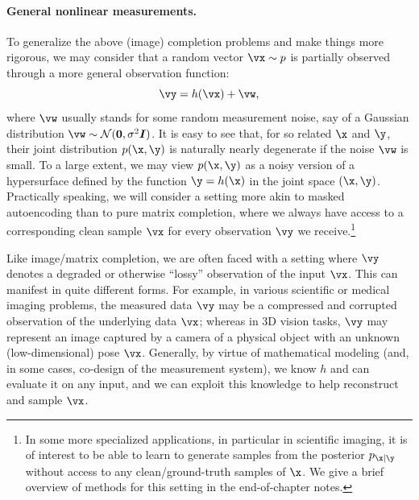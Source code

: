 \documentclass[../../book-main.tex]{subfiles}
\begin{document}
\paragraph{General nonlinear measurements.}
To generalize the above (image) completion problems and make things more rigorous, we may consider that a random vector $\vx \sim p$ is partially observed through a more
general observation function:
\begin{equation}\label{eq:measurement-matching-observation}
\vy = h(\vx) + \vw,
\end{equation}
where $\vw$ usually stands for some random measurement noise, say of
a Gaussian distribution $\vw \sim \mathcal{N}(\mathbf{0}, \sigma^2
\boldsymbol{I})$. It is easy to see that, for so related $\x$ and $\y$, their joint distribution $p(\x, \y)$ is naturally nearly degenerate if the noise $\vw$ is small. To a large extent, we may view $p(\x, \y)$ as a noisy version of a hypersurface defined by the function $\y = h(\x)$ in the joint space $(\x, \y)$.  Practically speaking, we will consider a setting more akin to masked autoencoding than to pure matrix completion, where we always have access to a corresponding clean sample $\vx$ for every observation $\vy$ we receive.\footnote{In some more specialized applications, in particular in scientific imaging, it is of interest to be able to learn to generate samples
from the posterior $p_{\x \mid \y}$ without access to any clean/ground-truth samples of $\x$. We give a brief overview of methods for this setting in the
end-of-chapter notes.}

Like image/matrix completion, we
are often faced with a setting where $\vy$ denotes a degraded or otherwise
``lossy''
observation of the input $\vx$. This can manifest in quite different
forms. For example, in various scientific or
medical imaging problems, the measured data $\vy$ may be a compressed and
corrupted observation of the underlying data $\vx$; whereas in 3D vision tasks,
$\vy$ may represent an image captured by a camera of a physical object with an
unknown (low-dimensional) pose $\vx$.
Generally, by virtue of mathematical modeling (and, in some cases, co-design
of the measurement system), we know $h$ and can evaluate it on any input, and
we can exploit this knowledge to help reconstruct and sample $\vx$.
\end{document}
